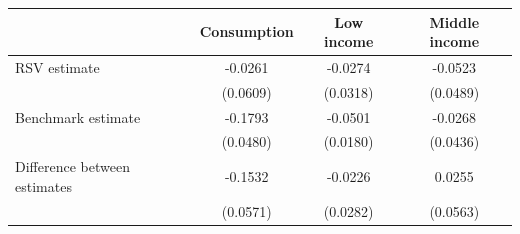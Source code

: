 \begin{threeparttable}
\begin{tabular}{l | ccc}
\toprule
& \multicolumn{1}{c}{Consumption} & \multicolumn{1}{c}{Low income} & \multicolumn{1}{c}{Middle income} \\
\midrule
  RSV estimate & -0.0261 & -0.0274 & -0.0523 \\
           & (0.0609) & (0.0318) & (0.0489) \\
\midrule
\addlinespace[0.3em]
  Benchmark estimate & -0.1793 & -0.0501 & -0.0268 \\
           & (0.0480) & (0.0180) & (0.0436) \\
\midrule
  Difference between estimates & -0.1532 & -0.0226 & 0.0255 \\
           & (0.0571) & (0.0282) & (0.0563) \\
\bottomrule
\end{tabular}
\end{threeparttable}
